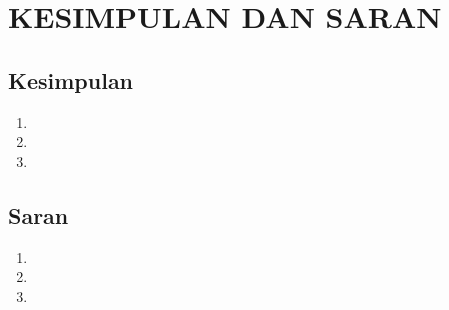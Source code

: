 \chapter{KESIMPULAN DAN SARAN}
\label{kesimpulan-dan-saran}



\section{Kesimpulan}

\begin{enumerate}
\item \lipsum[51]
\item \lipsum[130]
\item \lipsum[120]
\end{enumerate}


\section{Saran}

\begin{enumerate}
	\item \lipsum[104]
	\item \lipsum[132]
	\item \lipsum[115]
\end{enumerate}
